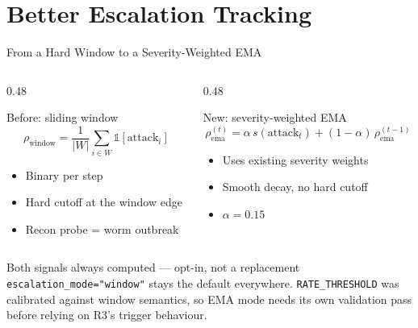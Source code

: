 \documentclass[aspectratio=169, 12pt]{beamer}
\begin{document}
\section{Better Escalation Tracking}

\begin{frame}{From a Hard Window to a Severity-Weighted EMA}
  \begin{columns}[T]
    \begin{column}{0.48\textwidth}
      \begin{block}{Before: sliding window}
        \[
          \rho_{\text{window}} = \frac{1}{|W|}\sum_{i \in W} \mathbb{1}[\text{attack}_i]
        \]
        \begin{itemize}
          \item Binary per step
          \item Hard cutoff at the window edge
          \item Recon probe = worm outbreak
        \end{itemize}
      \end{block}
    \end{column}
    \begin{column}{0.48\textwidth}
      \begin{exampleblock}{New: severity-weighted EMA}
        \[
          \rho^{(t)}_{\text{ema}} = \alpha\, s(\text{attack}_t) + (1-\alpha)\,\rho^{(t-1)}_{\text{ema}}
        \]
        \begin{itemize}
          \item Uses existing severity weights
          \item Smooth decay, no hard cutoff
          \item $\alpha = 0.15$
        \end{itemize}
      \end{exampleblock}
    \end{column}
  \end{columns}
  \vspace{0.3cm}
  \begin{alertblock}{Both signals always computed — opt-in, not a replacement}
    \texttt{escalation\_mode="window"} stays the default everywhere.
    \texttt{RATE\_THRESHOLD} was calibrated against window semantics, so
    EMA mode needs its own validation pass before relying on R3's
    trigger behaviour.
  \end{alertblock}
\end{frame}
\end{document}
